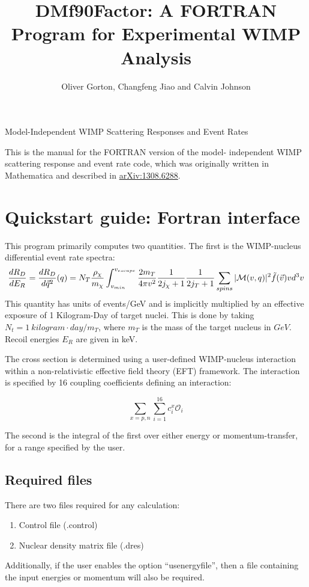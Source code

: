 \documentclass[11pt]{article}
\title{DMf90Factor: A FORTRAN Program for Experimental WIMP Analysis}
\author{Oliver Gorton, Changfeng Jiao and Calvin Johnson}
\begin{document}
\maketitle

{

\centering

Model-Independent WIMP Scattering Responses and Event Rates

}

\tableofcontents

This is the manual for the FORTRAN version of the model- independent WIMP 
scattering response and event rate code, which was originally written in 
Mathematica and described in 
\href{http://arxiv.org/abs/1308.6288v1}{arXiv:1308.6288}.

\clearpage

\section{Quickstart guide: Fortran interface}
This program primarily computes two quantities. The first is the WIMP-nucleus
differential event rate spectra:
\begin{dmath}
\frac{dR_D}{dE_R} = \frac{dR_D}{d\vec{q}^2}(q)
	\\= N_T\frac{\rho_\chi}{m_\chi}\int_{v_{min}}^{v_{escape}} 
	\frac{2m_T}{4\pi v^2}\frac{1}{2j_\chi+1}\frac{1}{2j_T+1}
	\sum_{spins}|\mathcal{M}(v,q)|^2  \tilde{f}(\vec{v})vd^3v
\end{dmath}
This quantity has units of events/GeV and is implicitly multiplied by
an effective exposure of 1 Kilogram-Day of target nuclei. This is done by
taking $N_t = 1\ kilogram\cdot day / m_T$, where $m_T$ is the mass of the target
nucleus in $GeV$. Recoil energies $E_R$ are given in keV.

The cross section is determined using a user-defined WIMP-nucleus interaction
within a non-relativistic effective field theory (EFT) framework. The
interaction is specified by 16 coupling coefficients defining an interaction:

\begin{equation}
	\sum_{x=p,n}\sum_{i=1}^{16} c_i^x \mathcal{O}_i
\end{equation}

The second is the integral of the first over either energy or momentum-transfer,
for a range specified by the user. 

\subsection{Required files}
There are two files required for any calculation:
\begin{enumerate}
    \item Control file (.control)
    \item Nuclear density matrix file (.dres)
\end{enumerate}
Additionally, if the user enables the option ``usenergyfile'', then a file
containing the input energies or momentum will also be required.
\end{document}
